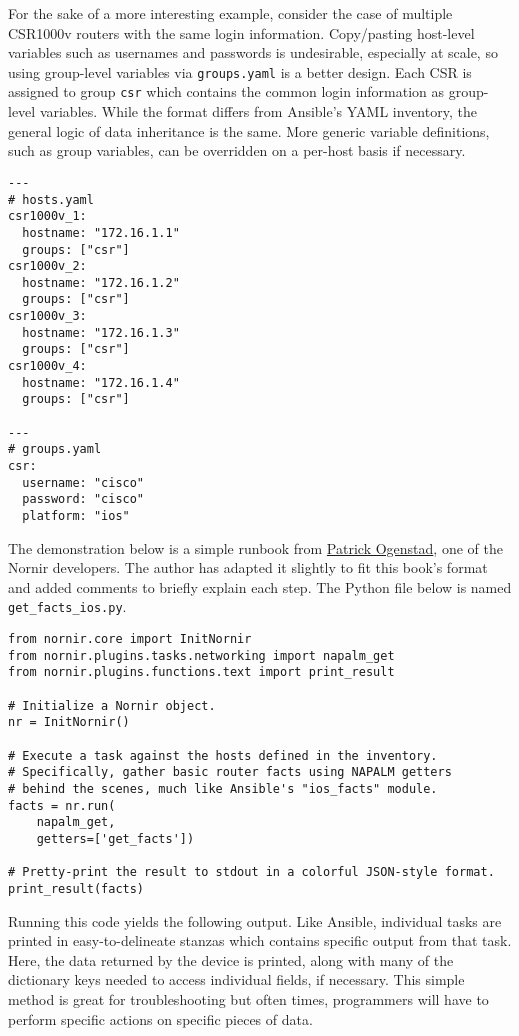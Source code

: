 For the sake of a more interesting example, consider the case of multiple
CSR1000v routers with the same login information. Copy/pasting host-level
variables such as usernames and passwords is undesirable, especially at scale,
so using group-level variables via \verb|groups.yaml| is a better design. Each
CSR is assigned to group \verb|csr| which contains the common login
information as group-level variables. While the format differs from Ansible's
YAML inventory, the general logic of data inheritance is the same. More
generic variable definitions, such as group variables, can be overridden on a
per-host basis if necessary.

\begin{verbatim}
---
# hosts.yaml
csr1000v_1:
  hostname: "172.16.1.1"
  groups: ["csr"]
csr1000v_2:
  hostname: "172.16.1.2"
  groups: ["csr"]
csr1000v_3:
  hostname: "172.16.1.3"
  groups: ["csr"]
csr1000v_4:
  hostname: "172.16.1.4"
  groups: ["csr"]

---
# groups.yaml
csr:
  username: "cisco"
  password: "cisco"
  platform: "ios"
\end{verbatim}

The demonstration below is a simple runbook from
\href{https://twitter.com/networklore}{Patrick Ogenstad}, one of the Nornir
developers. The author has adapted it slightly to fit this book's format and
added comments to briefly explain each step. The Python file below is
named \verb|get_facts_ios.py|.

\begin{verbatim}
from nornir.core import InitNornir
from nornir.plugins.tasks.networking import napalm_get
from nornir.plugins.functions.text import print_result

# Initialize a Nornir object.
nr = InitNornir()

# Execute a task against the hosts defined in the inventory.
# Specifically, gather basic router facts using NAPALM getters
# behind the scenes, much like Ansible's "ios_facts" module.
facts = nr.run(
    napalm_get,
    getters=['get_facts'])

# Pretty-print the result to stdout in a colorful JSON-style format.
print_result(facts)
\end{verbatim}

Running this code yields the following output. Like Ansible, individual tasks
are printed in easy-to-delineate stanzas which contains specific output from
that task. Here, the data returned by the device is printed, along with many
of the dictionary keys needed to access individual fields, if necessary. This
simple method is great for troubleshooting but often times, programmers will
have to perform specific actions on specific pieces of data.

